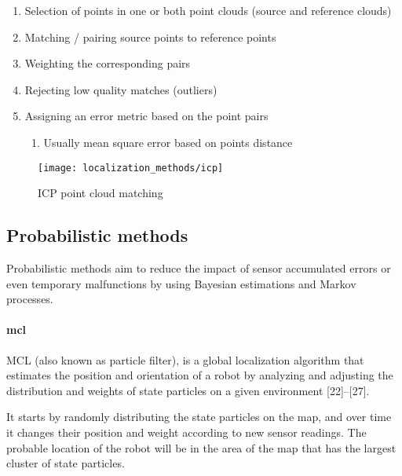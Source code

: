 \begin{enumerate}
\item  Selection of points in one or both point clouds (source and reference clouds)

\item  Matching / pairing source points to reference points

\item  Weighting the corresponding pairs

\item  Rejecting low quality matches (outliers)

\item  Assigning an error metric based on the point pairs

\begin{enumerate}
\item  Usually mean square error based on points distance
\end{enumerate}

\end{enumerate}


\begin{figure}[h]
	\centering
	\texttt{[image: localization\_methods/icp]}
	\caption{ICP point cloud matching}
	\label{fig:localization-methods_icp}
\end{figure}


\subsection{Probabilistic methods}

Probabilistic methods aim to reduce the impact of sensor accumulated errors or even temporary malfunctions by using Bayesian estimations and Markov processes.

\paragraph{\gls{mcl}}

MCL (also known as particle filter), is a global localization algorithm that estimates the position and orientation of a robot by analyzing and adjusting the distribution and weights of state particles on a given environment [22]--[27].

It starts by randomly distributing the state particles on the map, and over time it changes their position and weight according to new sensor readings. The probable location of the robot will be in the area of the map that has the largest cluster of state particles.

